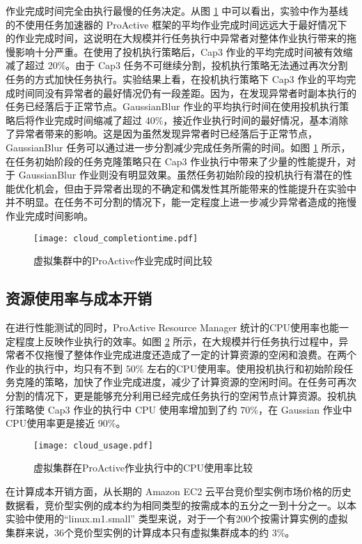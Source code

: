 作业完成时间完全由执行最慢的任务决定。从图 \ref{figure:completiontime_cloud} 中可以看出，实验中作为基线的不使用任务加速器的 ProActive 框架的平均作业完成时间远远大于最好情况下的作业完成时间，这说明在大规模并行任务执行中异常者对整体作业执行带来的拖慢影响十分严重。在使用了投机执行策略后，Cap3 作业的平均完成时间被有效缩减了超过 20\%。由于 Cap3 任务不可继续分割，投机执行策略无法通过再次分割任务的方式加快任务执行。实验结果上看，在投机执行策略下 Cap3 作业的平均完成时间同没有异常者的最好情况仍有一段差距。因为，在发现异常者时副本执行的任务已经落后于正常节点。GaussianBlur 作业的平均执行时间在使用投机执行策略后将作业完成时间缩减了超过 40\%，接近作业执行时间的最好情况，基本消除了异常者带来的影响。这是因为虽然发现异常者时已经落后于正常节点，GaussianBlur 任务可以通过进一步分割减少完成任务所需的时间。如图 \ref{figure:completiontime_cloud} 所示，在任务初始阶段的任务克隆策略只在 Cap3 作业执行中带来了少量的性能提升，对于 GaussianBlur 作业则没有明显效果。虽然任务初始阶段的投机执行有潜在的性能优化机会，但由于异常者出现的不确定和偶发性其所能带来的性能提升在实验中并不明显。在任务不可分割的情况下，能一定程度上进一步减少异常者造成的拖慢作业完成时间影响。
\begin{figure}
  \centering
  \texttt{[image: cloud\_completiontime.pdf]}
  \caption{虚拟集群中的ProActive作业完成时间比较}
  \label{figure:completiontime_cloud}
\end{figure}

\subsection{资源使用率与成本开销}
\label{sec:no2_usage}
在进行性能测试的同时，ProActive Resource Manager 统计的CPU使用率也能一定程度上反映作业执行的效率。如图 \ref{figure:resourceusage_cloud} 所示，在大规模并行任务执行过程中，异常者不仅拖慢了整体作业完成进度还造成了一定的计算资源的空闲和浪费。在两个作业的执行中，均只有不到 50\% 左右的CPU使用率。使用投机执行和初始阶段任务克隆的策略，加快了作业完成进度，减少了计算资源的空闲时间。在任务可再次分割的情况下，更是能够充分利用已经完成任务执行的空闲节点计算资源。投机执行策略使 Cap3 作业的执行中 CPU 使用率增加到了约 70\%，在 Gaussian 作业中CPU使用率更是接近 90\%。
\begin{figure}
  \centering
  \texttt{[image: cloud\_usage.pdf]}
  \caption{虚拟集群在ProActive作业执行中的CPU使用率比较}
  \label{figure:resourceusage_cloud}
\end{figure}

在计算成本开销方面，从长期的 Amazon EC2 云平台竞价型实例市场价格的历史数据看，竞价型实例的成本约为相同类型的按需成本的五分之一到十分之一。以本实验中使用的``linux.m1.small'' 类型来说，对于一个有200个按需计算实例的虚拟集群来说，36个竞价型实例的计算成本只有虚拟集群成本的约 3\%。

